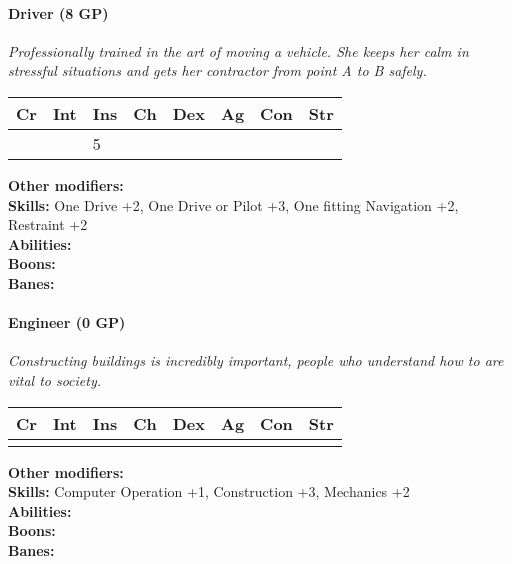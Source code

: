 \paragraph*{Driver (8 GP)}
\textit{Professionally trained in the art of moving a vehicle. She keeps her calm in stressful situations and gets her contractor from point A to B safely.}\par
\begin{tabular}{|l|l|l|l|l|l|l|l|}
	\hline
	Cr & Int & Ins & Ch & Dex & Ag & Con & Str \\ \hline
	&  & 5 &  &  &  &  &  \\ \hline
\end{tabular}\par
\noindent\textbf{Other modifiers:} \\
\textbf{Skills:} One Drive +2,
One Drive or Pilot +3,
One fitting Navigation +2,
Restraint +2\\
\textbf{Abilities:} \\
\textbf{Boons:} \\
\textbf{Banes:} \\

\hrulefill
\paragraph*{Engineer (0 GP)}
\textit{Constructing buildings is incredibly important, people who understand how to are vital to society.}\par
\begin{tabular}{|l|l|l|l|l|l|l|l|}
	\hline
	Cr & Int & Ins & Ch & Dex & Ag & Con & Str \\ \hline
	&  &  &  &  &  &  &  \\ \hline
\end{tabular}\par
\noindent\textbf{Other modifiers:} \\
\textbf{Skills:} Computer Operation +1,
Construction +3,
Mechanics +2\\
\textbf{Abilities:} \\
\textbf{Boons:} \\
\textbf{Banes:} \\

\hrulefill

